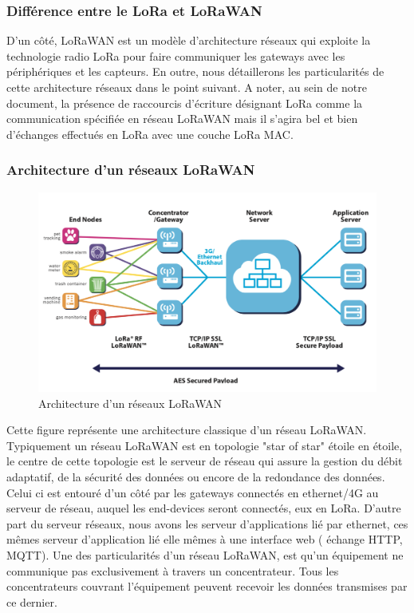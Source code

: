 \documentclass[11pt]{article}
\begin{document}
\subsubsection{Différence entre le LoRa et LoRaWAN}
D'un côté, LoRaWAN est un modèle d'architecture réseaux qui exploite la technologie radio LoRa pour faire communiquer les gateways avec les périphériques et les capteurs. En outre, nous détaillerons les particularités de cette architecture réseaux dans le point suivant. A noter, au sein de notre document, la présence de raccourcis d'écriture désignant LoRa comme la communication spécifiée en réseau LoRaWAN mais il s'agira bel et bien d'échanges effectués en LoRa avec une couche LoRa MAC. 
 
\subsubsection{Architecture d'un réseaux LoRaWAN}
\begin{figure}[h!]
\centering
\includegraphics[scale=0.6]{networkArch.png}
\caption{Architecture d'un réseaux LoRaWAN}
\end{figure}
Cette figure représente une architecture classique d'un réseau LoRaWAN. Typiquement un réseau LoRaWAN est en topologie "star of star" étoile en étoile, le centre de cette topologie est le serveur de réseau qui assure la gestion du débit adaptatif, de la sécurité des données ou encore de la redondance des données. Celui ci est entouré d'un côté par les gateways connectés en ethernet/4G au serveur de réseau, auquel les end-devices seront connectés, eux en LoRa. D'autre part du serveur réseaux, nous avons les serveur d'applications lié par ethernet, ces mêmes serveur d'application lié elle mêmes à une interface web ( échange HTTP, MQTT).
Une des particularités d’un réseau LoRaWAN, est qu’un équipement ne communique pas exclusivement à travers un concentrateur. Tous les concentrateurs couvrant l’équipement peuvent recevoir les données transmises par ce dernier.
\end{document}
